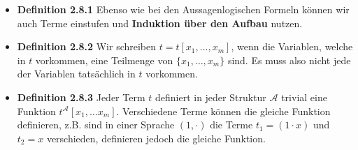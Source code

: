 \documentclass{scrartcl}
\begin{document}
\begin{itemize}
    \item \textbf{Definition 2.8.1} Ebenso wie bei den Aussagenlogischen Formeln können wir auch Terme einstufen und \textbf{Induktion über den Aufbau} nutzen. 
    \item \textbf{Definition 2.8.2} Wir schreiben $t = t[x_1, \hdots, x_m]$, wenn die Variablen, welche in $t$ vorkommen, eine Teilmenge von $\{x_1, \hdots, x_m\}$ sind. Es muss also nicht jede der Variablen tatsächlich in $t$ vorkommen.
    \item \textbf{Definition 2.8.3} Jeder Term $t$ definiert in jeder Struktur $\mathcal{A}$ trivial eine Funktion $t^\mathcal{A}[x_1, \hdots x_m]$. Verschiedene Terme können die gleiche Funktion definieren, z.B. sind in einer Sprache $(1,\cdot)$ die Terme $t_1 = (1 \cdot x)$ und $t_2 = x$ verschieden, definieren jedoch die gleiche Funktion.
    
    \pagebreak
    

\end{itemize}
\end{document}
